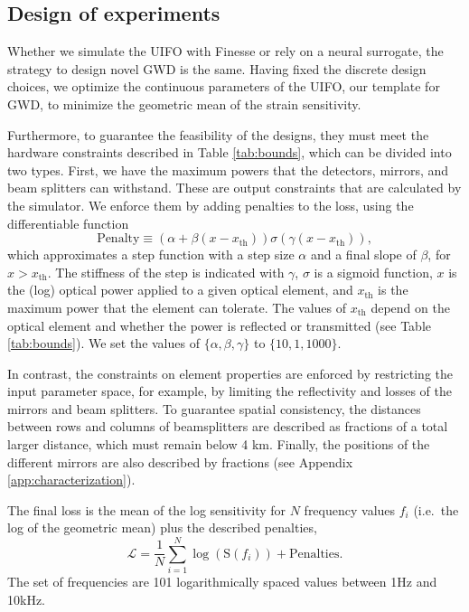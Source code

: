 \documentclass[a4paper,twocolumn,11pt,unpublished]{quantumarticle}
\begin{document}
\subsection{Design of experiments} \label{sec:design}
Whether we simulate the UIFO with Finesse or rely on a neural surrogate, the strategy to design novel GWD is the same. Having fixed the discrete design choices, we optimize the continuous parameters of the UIFO, our template for GWD, to minimize the geometric mean of the strain sensitivity.

Furthermore, to guarantee the feasibility of the designs, they must meet the hardware constraints described in Table \ref{tab:bounds}, which can be divided into two types. First, we have the maximum powers that the detectors, mirrors, and beam splitters can withstand. These are output constraints that are calculated by the simulator. We enforce them by adding penalties to the loss, using the differentiable function
\begin{equation}
\label{eq:penalties}
    \text{Penalty} \equiv (\alpha +\beta(x-x_\text{th})) \sigma(\gamma (x-x_\text{th})),
\end{equation}
which approximates a step function with a step size $\alpha$ and a final slope of $\beta$, for $x>x_\text{th}$. The stiffness of the step is indicated with $\gamma$, $\sigma$ is a sigmoid function, $x$ is the (log) optical power applied to a given optical element, and $x_\text{th}$ is the maximum power that the element can tolerate. The values of $x_\text{th}$ depend on the optical element and whether the power is reflected or transmitted (see Table \ref{tab:bounds}). We set the values of $\{\alpha, \beta, \gamma\}$ to $\{10, 1, 1000\}$.

In contrast, the constraints on element properties are enforced by restricting the input parameter space, for example, by limiting the reflectivity and losses of the mirrors and beam splitters. To guarantee spatial consistency, the distances between rows and columns of beamsplitters are described as fractions of a total larger distance, which must remain below 4 km. Finally, the positions of the different mirrors are also described by fractions (see Appendix \ref{app:characterization}).

The final loss is the mean of the log sensitivity for $N$ frequency values $f_i$ (i.e.~the log of the geometric mean) plus the described penalties,
\begin{equation}\label{eq:loss}
    \mathcal{L}=\frac{1}{N}\sum_{i=1}^N\log(\text{S}(f_i)) + \text{Penalties}.
\end{equation}
The set of frequencies are 101 logarithmically spaced values between 1Hz and 10kHz. 
\end{document}

